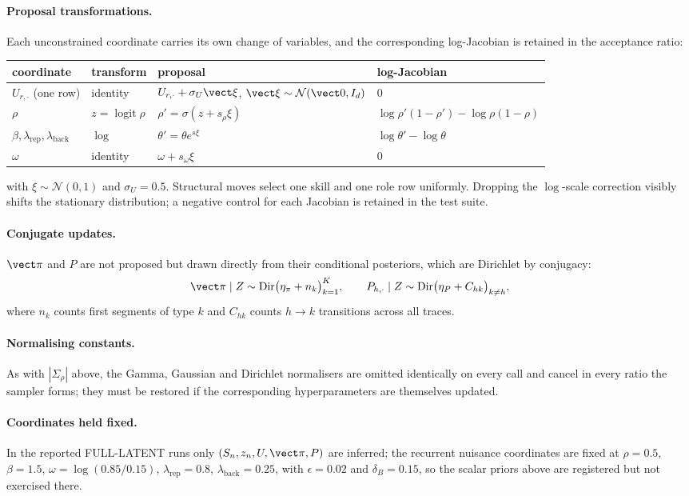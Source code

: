 \paragraph{Proposal transformations.}
Each unconstrained coordinate carries its own change of variables, and the
corresponding log-Jacobian is retained in the acceptance ratio:
\begin{center}
\begin{tabular}{@{}llll@{}}
\toprule
coordinate & transform & proposal & log-Jacobian \\
\midrule
$U_{r,\cdot}$ (one row)
  & identity & $U_{r,\cdot}+\sigma_U\vect\xi$, $\vect\xi\sim\mathcal N(\vect0,I_d)$ & $0$ \\
$\rho$
  & $z=\operatorname{logit}\rho$ & $\rho'=\sigma(z+s_\rho\xi)$
  & $\log\rho'(1-\rho')-\log\rho(1-\rho)$ \\
$\beta,\lambda_{\mathrm{rep}},\lambda_{\mathrm{back}}$
  & $\log$ & $\theta'=\theta e^{s\xi}$ & $\log\theta'-\log\theta$ \\
$\omega$
  & identity & $\omega+s_\omega\xi$ & $0$ \\
\bottomrule
\end{tabular}
\end{center}
with $\xi\sim\mathcal N(0,1)$ and $\sigma_U=0.5$.  Structural moves select one
skill and one role row uniformly.  Dropping the $\log$-scale correction visibly
shifts the stationary distribution; a negative control for each Jacobian is
retained in the test suite.

\paragraph{Conjugate updates.}
$\vect\pi$ and $P$ are not proposed but drawn directly from their conditional
posteriors, which are Dirichlet by conjugacy:
\begin{equation}
  \vect\pi\mid Z \sim \mathrm{Dir}\bigl(\eta_\pi+n_k\bigr)_{k=1}^{K},
  \qquad
  P_{h,\cdot}\mid Z \sim \mathrm{Dir}\bigl(\eta_P+C_{hk}\bigr)_{k\neq h},
\end{equation}
where $n_k$ counts first segments of type $k$ and $C_{hk}$ counts $h\to k$
transitions across all traces.

\paragraph{Normalising constants.}
As with $|\Sigma_\rho|$ above, the Gamma, Gaussian and Dirichlet normalisers are
omitted identically on every call and cancel in every ratio the sampler forms;
they must be restored if the corresponding hyperparameters are themselves
updated.

\paragraph{Coordinates held fixed.}
In the reported FULL-LATENT runs only $(S_n,z_n,U,\vect\pi,P)$ are inferred; the
recurrent nuisance coordinates are fixed at $\rho=0.5$, $\beta=1.5$,
$\omega=\log(0.85/0.15)$, $\lambda_{\mathrm{rep}}=0.8$,
$\lambda_{\mathrm{back}}=0.25$, with $\epsilon=0.02$ and $\delta_B=0.15$, so the
scalar priors above are registered but not exercised there.
